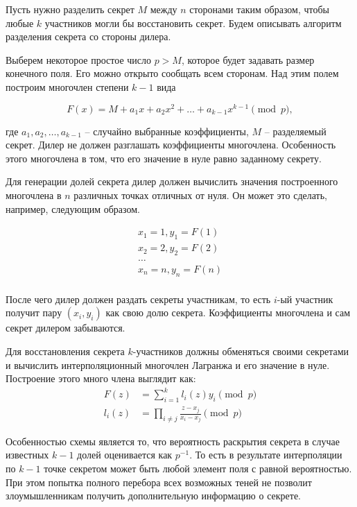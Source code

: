 \documentclass[a4paper,12pt]{article}
\theoremstyle{definition}
\begin{document}
		Пусть нужно разделить секрет $M$ между $n$ сторонами таким образом, чтобы любые $k$ участников могли бы восстановить секрет. Будем описывать алгоритм разделения секрета со стороны дилера. 
		
		Выберем некоторое простое число $p>M$, которое будет задавать размер конечного поля. Его можно открыто сообщать всем сторонам. Над этим полем построим многочлен степени $k-1$ вида
		
		\[ F(x) = M + a_1 x + a_2 x^2 + \dots + a_{k-1} x^{k-1} \pmod p, \]
		
		где $a_1, a_2, \dots, a_{k-1}$ – случайно выбранные коэффициенты, $M$ – разделяемый секрет. Дилер не должен разглашать коэффициенты многочлена. Особенность этого многочлена в том, что его значение в нуле равно заданному секрету.
		
		Для генерации долей секрета дилер должен вычислить значения построенного многочлена в $n$ различных точках отличных от нуля. Он может это сделать, например, следующим образом.
		
		\begin{gather*}
			x_1=1, y_1 = F(1) \\
			x_2=2, y_2 = F(2) \\
			\dots 			  \\
			x_n=n, y_n = F(n) \\
		\end{gather*}
		
		После чего дилер должен раздать секреты участникам, то есть $i$-ый участник получит пару $(x_i, y_i)$ как свою долю секрета. Коэффициенты многочлена и сам секрет дилером забываются.
		
		Для восстановления секрета $k$-участников должны обменяться своими секретами и вычислить интерполяционный многочлен Лагранжа и его значение в нуле. Построение этого много члена выглядит как:
		\begin{align*}
			F(z) &= \sum_{i=1}^{k} l_i(z) y_i \pmod p  \\
			l_i(z) &= \prod_{i\ne j} \frac{z-x_j}{x_i - x_j} \pmod p 
		\end{align*}
	
		Особенностью схемы является то, что вероятность раскрытия секрета в случае известных $k-1$ долей оценивается как $p^{-1}$. То есть в результате интерполяции по $k-1$ точке секретом может быть любой элемент поля с равной вероятностью. При этом попытка полного перебора всех возможных теней не позволит злоумышленникам получить дополнительную информацию о секрете.
		
\end{document}
